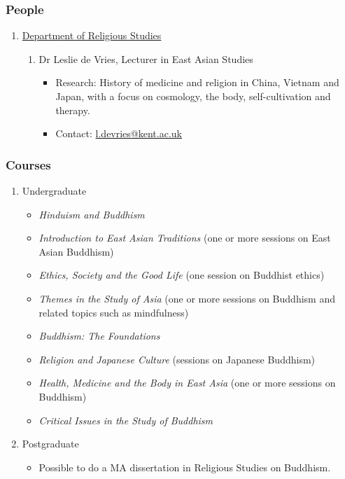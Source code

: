 \documentclass[a4paper,10.5pt]{article}
\begin{document}
\subsubsection{People}
\label{sec:org4d4c5e8}
\begin{enumerate}
\item \href{https://www.kent.ac.uk/religious-studies/}{Department of Religious Studies}
\label{sec:orgb287bd9}
\begin{enumerate}
\item Dr Leslie de Vries, Lecturer in East Asian Studies
\label{sec:orga530de0}
\begin{itemize}
\item Research: History of medicine and religion in China, Vietnam and Japan, with a focus on cosmology, the body, self-cultivation and therapy.\\
\item Contact: \href{mailto:l.devries@kent.ac.uk}{l.devries@kent.ac.uk}\\
\end{itemize}
\end{enumerate}
\end{enumerate}
\subsubsection{Courses}
\label{sec:org9418f7c}
\begin{enumerate}
\item Undergraduate
\label{sec:org80b603c}
\begin{itemize}
\item \emph{Hinduism and Buddhism}\\
\item \emph{Introduction to East Asian Traditions} (one or more sessions on East Asian Buddhism)\\
\item \emph{Ethics, Society and the Good Life} (one session on Buddhist ethics)\\
\item \emph{Themes in the Study of Asia} (one or more sessions on Buddhism and related topics such as mindfulness)\\
\item \emph{Buddhism: The Foundations}\\
\item \emph{Religion and Japanese Culture} (sessions on Japanese Buddhism)\\
\item \emph{Health, Medicine and the Body in East Asia} (one or more sessions on Buddhism)\\
\item \emph{Critical Issues in the Study of Buddhism}\\
\end{itemize}
\item Postgraduate
\label{sec:org0b2ddad}
\begin{itemize}
\item Possible to do a MA dissertation in Religious Studies on Buddhism.\\
\end{itemize}
\end{enumerate}
\end{document}
